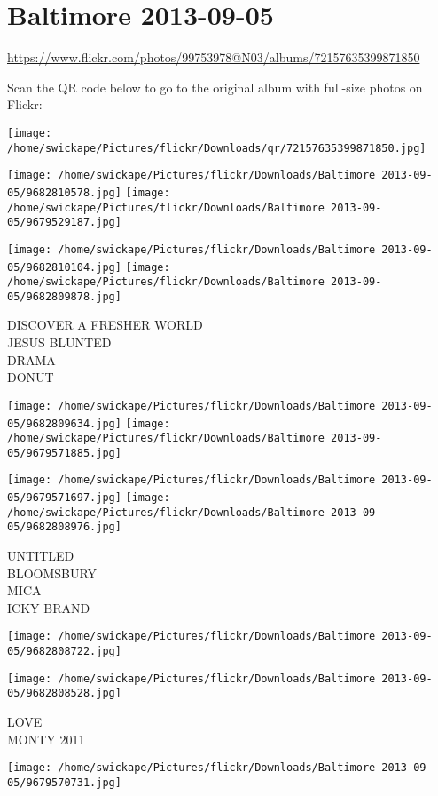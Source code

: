 \documentclass[10pt,letterpaper]{article}
\title{}
\author{}
\date{}
\begin{document}
\section*{Baltimore 2013-09-05}

\url{https://www.flickr.com/photos/99753978@N03/albums/72157635399871850}

Scan the QR code below to go to the original album with full-size photos on Flickr:

\texttt{[image: /home/swickape/Pictures/flickr/Downloads/qr/72157635399871850.jpg]}
\pagebreak

\texttt{[image: /home/swickape/Pictures/flickr/Downloads/Baltimore 2013-09-05/9682810578.jpg]}
\texttt{[image: /home/swickape/Pictures/flickr/Downloads/Baltimore 2013-09-05/9679529187.jpg]}

\texttt{[image: /home/swickape/Pictures/flickr/Downloads/Baltimore 2013-09-05/9682810104.jpg]}
\texttt{[image: /home/swickape/Pictures/flickr/Downloads/Baltimore 2013-09-05/9682809878.jpg]}

DISCOVER A FRESHER WORLD\\
JESUS BLUNTED\\
DRAMA\\
DONUT
\pagebreak

\texttt{[image: /home/swickape/Pictures/flickr/Downloads/Baltimore 2013-09-05/9682809634.jpg]}
\texttt{[image: /home/swickape/Pictures/flickr/Downloads/Baltimore 2013-09-05/9679571885.jpg]}

\texttt{[image: /home/swickape/Pictures/flickr/Downloads/Baltimore 2013-09-05/9679571697.jpg]}
\texttt{[image: /home/swickape/Pictures/flickr/Downloads/Baltimore 2013-09-05/9682808976.jpg]}

UNTITLED\\
BLOOMSBURY\\
MICA\\
ICKY BRAND
\pagebreak

\texttt{[image: /home/swickape/Pictures/flickr/Downloads/Baltimore 2013-09-05/9682808722.jpg]}

\vspace{0.25in}
\texttt{[image: /home/swickape/Pictures/flickr/Downloads/Baltimore 2013-09-05/9682808528.jpg]}

LOVE\\
MONTY 2011
\pagebreak

\texttt{[image: /home/swickape/Pictures/flickr/Downloads/Baltimore 2013-09-05/9679570731.jpg]}
\end{document}
